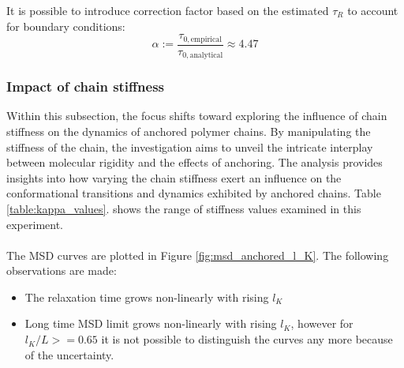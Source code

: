 \documentclass[
    paper=A4,pagesize=automedia,fontsize=12pt,
    BCOR=15mm,DIV=22,
    twoside,headinclude,footinclude=false,
    ngerman,fleqn,             %
    bibliography=totocnumbered,          %
    listof=totoc,                %
    listof=flat,                 %
    cleardoublepage=empty      %
    numbers=endperiod
]{scrartcl}
\begin{document}
It is possible to introduce correction factor based on the estimated $\tau_R$
to account for boundary conditions:
\begin{equation}
    \alpha := \frac{\tau_{0, \textrm{empirical}}}{\tau_{0, \textrm{analytical}}} \approx 4.47
\end{equation}



\subsubsection{Impact of chain stiffness}
Within this subsection, the focus shifts 
toward exploring the influence of chain stiffness on
the dynamics of anchored polymer chains. 
By manipulating the stiffness of the chain, the investigation aims to 
unveil the intricate interplay between molecular rigidity 
and the effects of anchoring. The analysis provides insights into 
how varying the chain stiffness exert an influence on the
conformational transitions and dynamics exhibited by anchored chains.
Table \ref{table:kappa_values}. shows the range of stiffness values examined
in this experiment.
\\
\\
The MSD curves are plotted in Figure \ref{fig:msd_anchored_l_K}.
The following observations are made:
\begin{itemize}
    \item The relaxation time grows non-linearly with rising $l_K$
    \item Long time MSD limit grows non-linearly with rising $l_K$,
    however for $l_K/L >= 0.65$ it is not possible to distinguish 
    the curves any more because of the uncertainty.
\end{itemize}
\end{document}
